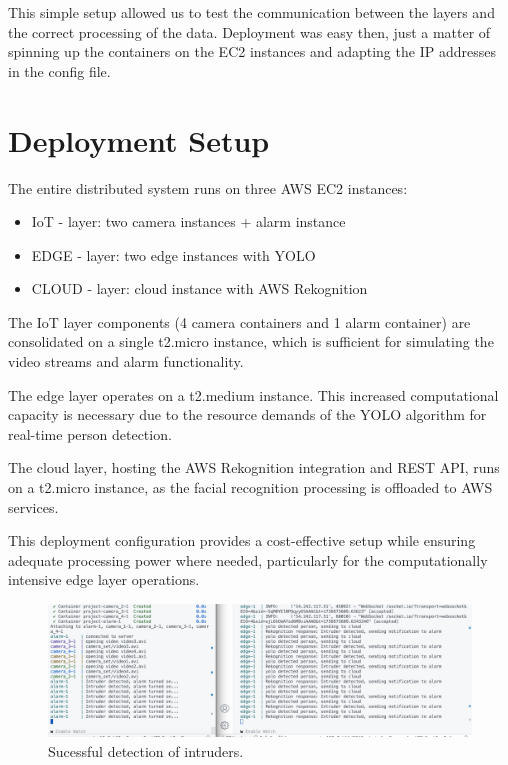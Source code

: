 \documentclass[conference]{IEEEtran}
\begin{document}
This simple setup allowed us to test the communication between the layers and the correct processing of the data. 
Deployment was easy then, just a matter of spinning up the containers on the EC2 instances and adapting the IP addresses in the config file.

\section{Deployment Setup}
The entire distributed system runs on three AWS EC2 instances:
\begin{itemize}
    \item IoT - layer: two camera instances + alarm instance
    \item EDGE - layer: two edge instances with YOLO
    \item CLOUD - layer: cloud instance with AWS Rekognition
\end{itemize}


The IoT layer components (4 camera containers and 1 alarm container) are consolidated on a single t2.micro instance, which is sufficient for simulating the video streams and alarm functionality.

The edge layer operates on a t2.medium instance. This increased computational capacity is necessary due to the resource demands of the YOLO algorithm for real-time person detection.

The cloud layer, hosting the AWS Rekognition integration and REST API, runs on a t2.micro instance, as the facial recognition processing is offloaded to AWS services.

This deployment configuration provides a cost-effective setup while ensuring adequate processing power where needed, particularly for the computationally intensive edge layer operations.

\begin{figure}[h!]
    \centering
    \includegraphics[width=1\linewidth]{res/deployment2.png}
    \caption{Sucessful detection of intruders.}
    \label{fig:deployment}
\end{figure}
\end{document}

